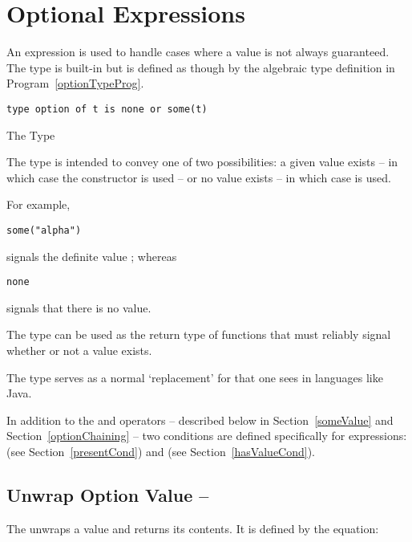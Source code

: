 \section{Optional Expressions}
\label{optionExpression}

An  expression is used to handle cases where a value is not always guaranteed. The  type is built-in but is defined as though by the algebraic type definition in Program~\vref{optionTypeProg}.

\begin{program}
\begin{lstlisting}
type option of t is none or some(t)
\end{lstlisting}
\caption{The  Type}
\label{optionTypeProg}
\end{program}

The  type is intended to convey one of two possibilities: a given value exists -- in which case the  constructor is used -- or no value exists -- in which case  is used.

For example,
\begin{lstlisting}
some("alpha")
\end{lstlisting}
signals the definite  value ; whereas 
\begin{lstlisting}
none
\end{lstlisting}
signals that there is no value.

The  type can be used as the return type of functions that must reliably signal whether or not a value exists.
\begin{aside}
The  type serves as a normal `replacement' for  that one sees in languages like Java.
\end{aside}

In addition to the  and  operators -- described below in Section~\vref{someValue} and Section~\vref{optionChaining} -- two conditions are defined specifically for  expressions:  (see Section~\vref{presentCond}) and  (see Section~\vref{hasValueCond}).

\subsection{Unwrap Option Value -- }
\label{someValue}

The  unwraps a  value and returns its contents. It is defined by the equation:

